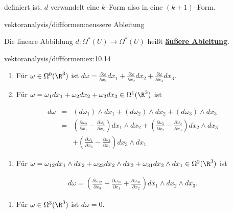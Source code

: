 \documentclass[letterpaper,10pt,english]{jupyterBook}
\begin{document}
\par
definiert ist. \(d\) verwandelt eine \(k\)–Form also in eine \((k+1)\)–Form.
\begin{definition}{}{vektoranalysis/diffformen:aeussere Ableitung}



\par
Die lineare Abbildung \(d:\Omega^*(U)\to\Omega^*(U)\) heißt \href{https://de.wikipedia.org/wiki/\%C3\%84u\%C3\%9Fere\_Ableitung}{\textbf{äußere Ableitung}}.
\end{definition}
\begin{example}{}{vektoranalysis/diffformen:ex:10.14}


\begin{enumerate}

\item {} 
\par
Für \(\omega\in\Omega^0(\R^3)\) ist \(d\omega = \frac{\partial\omega}{\partial x_1}dx_1+
\frac{\partial\omega}{\partial x_2}dx_2+\frac{\partial\omega}{\partial x_3}dx_3\).

\item {} 
\par
Für \(\omega = \omega_1dx_1+\omega_2dx_2+\omega_3dx_3\in\Omega^1(\R^3)\) ist

\end{enumerate}
\begin{align*}
d\omega &=& (d\omega_1)\wedge dx_1+(d\omega_2)\wedge dx_2+(d\omega_3)\wedge
dx_3\\
&=& \left(\frac{\partial\omega_2}{\partial x_1}-\frac{\partial\omega_1}{\partial x_2}\right)
dx_1\wedge dx_2+ \left(\frac{\partial\omega_3}{\partial x_2}-\frac{\partial\omega_2}{\partial x_3}\right)
dx_2\wedge dx_3\\
&& + \left(\frac{\partial\omega_1}{\partial x_3}-\frac{\partial\omega_3}{\partial x_1}\right)
dx_3\wedge dx_1
\end{align*}\begin{enumerate}

\item {} 
\par
Für \(\omega = \omega_{12}dx_1\wedge dx_2+\omega_{23}dx_2\wedge dx_3
+\omega_{31}dx_3\wedge dx_1 \in\Omega^2(\R^3)\) ist

\end{enumerate}
\begin{align*}
d\omega = \left(\frac{\partial\omega_{12}}{\partial x_3} + \frac{\partial\omega_{23}}{\partial x_1}
+ \frac{\partial\omega_{31}}{\partial x_2}\right)dx_1\wedge dx_2\wedge dx_3.
\end{align*}\begin{enumerate}

\item {} 
\par
Für \(\omega\in\Omega^3(\R^3)\) ist \(d\omega=0\).

\end{enumerate}
\end{example}
\end{document}
